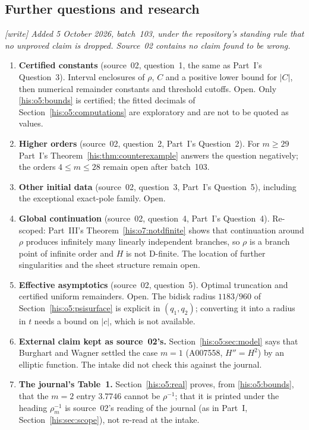 \documentclass[11pt]{article}
\theoremstyle{remark}\newtheorem{remark}[theorem]{Remark}
\numberwithin{equation}{section}
\begin{document}
\subsection{Further questions and research}\label{his:o5:sec:further}
\emph{\textsf{[write]} Added 5 October 2026, batch~103, under the repository's standing rule that no unproved claim is dropped. Source~02 contains no claim found to be wrong.}
\begin{enumerate}
\item \textbf{Certified constants} (source~02, question~1, the same as Part~I's Question~3). Interval enclosures of $\rho$, $C$ and a positive lower bound for $|C|$, then numerical remainder constants and threshold cutoffs. Open. Only \eqref{his:o5:bounds} is certified; the fitted decimals of Section~\ref{his:o5:computations} are exploratory and are not to be quoted as values.
\item \textbf{Higher orders} (source~02, question~2, Part~I's Question~2). For $m\ge29$ Part~I's Theorem~\ref{his:thm:counterexample} answers the question negatively; the orders $4\le m\le28$ remain open after batch~103.
\item \textbf{Other initial data} (source~02, question~3, Part~I's Question~5), including the exceptional exact-pole family. Open.
\item \textbf{Global continuation} (source~02, question~4, Part~I's Question~4). Re-scoped: Part~III's Theorem~\ref{his:o7:notdfinite} shows that continuation around $\rho$ produces infinitely many linearly independent branches, so $\rho$ is a branch point of infinite order and $H$ is not D-finite. The location of further singularities and the sheet structure remain open.
\item \textbf{Effective asymptotics} (source~02, question~5). Optimal truncation and certified uniform remainders. Open. The bidisk radius $1183/960$ of Section~\ref{his:o5:psisurface} is explicit in $(q_1,q_2)$; converting it into a radius in $t$ needs a bound on $|c|$, which is not available.
\item \textbf{External claim kept as source~02's.} Section~\ref{his:o5:sec:model} says that Burghart and Wagner settled the case $m=1$ (A007558, $H''=H^2$) by an elliptic function. The intake did not check this against the journal.
\item \textbf{The journal's Table~1.} Section~\ref{his:o5:real} proves, from \eqref{his:o5:bounds}, that the $m=2$ entry $3.7746$ cannot be $\rho^{-1}$; that it is printed under the heading $\rho_m^{-1}$ is source~02's reading of the journal (as in Part~I, Section~\ref{his:sec:scope}), not re-read at the intake.
\end{enumerate}
\end{document}
